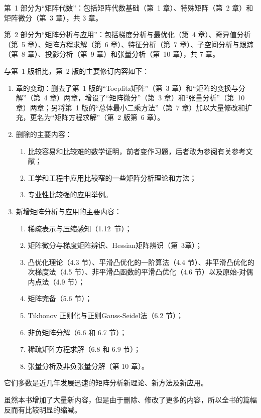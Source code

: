 \documentclass[punct=kaiming, fontset=fandol]{ctexbook}
\numberwithin{equation}{section}
\theoremstyle{mystyle}
\begin{document}
  第~1 部分为“矩阵代数”：包括矩阵代数基础（第~1 章）、特殊矩阵（第~2 章）和矩阵微分（第~3 章），共 3 章。

  第~2 部分为“矩阵分析与应用”：包括梯度分析与最优化（第~4 章）、奇异值分析（第~5 章）、矩阵方程求解（第~6 章）、特征分析（第~7 章）、子空间分析与跟踪（第~8 章）、投影分析（第~9 章）和张量分析（第~10 章），共 7 章。

  与第~1 版相比，第~2 版的主要修订内容如下：
  \begin{enumerate}
    \item 章的变动：删去了第~1 版的“Toeplitz矩阵”（第~3 章）和“矩阵的变换与分解”（第~4 章）两章，增设了“矩阵微分”（第~3 章）和“张量分析”（第~10 章）两章；另将第~1 版的“总体最小二乘方法”（第~7 章）加以大量修改和扩充，更名为“矩阵方程求解”（第~2 版第~6 章）。
    \item 删除的主要内容：
    \begin{enumerate}
      \item 比较容易和比较难的数学证明，前者变作习题，后者改为参阅有关参考文献；
      \item 工学和工程中应用比较窄的一些矩阵分析理论和方法；
      \item 专业性比较强的应用举例。
    \end{enumerate}
    \item 新增矩阵分析与应用的主要内容：
    \begin{enumerate}
      \item 稀疏表示与压缩感知（1.12~节）；
      \item 矩阵微分与梯度矩阵辨识、Hessian矩阵辨识（第~3章）；
      \item 凸优化理论（4.3 节）、平滑凸优化的一阶算法（4.4 节）、非平滑凸优化的次梯度法（4.5 节）、非平滑凸函数的平滑凸优化（4.6 节）以及原始-对偶内点法（4.9 节）；
      \item 矩阵完备（5.6 节）；
      \item Tikhonov 正则化与正则Gauss-Seidel法（6.2 节）；
      \item 非负矩阵分解（6.6 和 6.7 节）；
      \item 稀疏矩阵方程求解（6.8 和 6.9 节）；
      \item 张量分析及非负张量分解（第 10 章）。
    \end{enumerate}
  \end{enumerate}
  它们多数是近几年发展迅速的矩阵分析新理论、新方法及新应用。

  虽然本书增加了大量新内容，但是由于删除、修改了更多的内容，所以全书的篇幅反而有比较明显的缩减。
\end{document}

